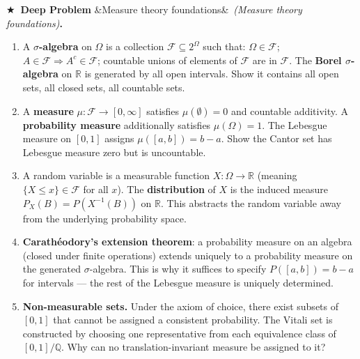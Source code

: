 \documentclass[12pt, a4paper]{article}
\newcounter{problem}
\newcounter{deepproblem}
\newenvironment{deepproblem}[1][]{%
  \refstepcounter{deepproblem}%
  \par\vspace{6pt}%
  \noindent\textbf{\color{NavyBlue}$\bigstar$\ Deep Problem \thedeepproblem}%
  \ifx&#1&\else\ \textit{(#1)}\fi\textbf{.}\enskip
}{\par\vspace{4pt}}
\begin{document}
\begin{deepproblem}[Measure theory foundations]
\begin{enumerate}[label=(\alph*)]
  \item A \textbf{$\sigma$-algebra} on $\Omega$ is a collection $\mathcal{F}\subseteq 2^\Omega$ such that: $\Omega\in\mathcal{F}$; $A\in\mathcal{F}\Rightarrow A^c\in\mathcal{F}$; countable unions of elements of $\mathcal{F}$ are in $\mathcal{F}$. The \textbf{Borel $\sigma$-algebra} on $\mathbb{R}$ is generated by all open intervals. Show it contains all open sets, all closed sets, all countable sets.
  \item A \textbf{measure} $\mu:\mathcal{F}\to[0,\infty]$ satisfies $\mu(\emptyset)=0$ and countable additivity. A \textbf{probability measure} additionally satisfies $\mu(\Omega)=1$. The Lebesgue measure on $[0,1]$ assigns $\mu([a,b])=b-a$. Show the Cantor set has Lebesgue measure zero but is uncountable.
  \item A random variable is a measurable function $X:\Omega\to\mathbb{R}$ (meaning $\{X\leq x\}\in\mathcal{F}$ for all $x$). The \textbf{distribution} of $X$ is the induced measure $P_X(B) = P(X^{-1}(B))$ on $\mathbb{R}$. This abstracts the random variable away from the underlying probability space.
  \item \textbf{Carathéodory's extension theorem}: a probability measure on an algebra (closed under finite operations) extends uniquely to a probability measure on the generated $\sigma$-algebra. This is why it suffices to specify $P([a,b])=b-a$ for intervals --- the rest of the Lebesgue measure is uniquely determined.
  \item \textbf{Non-measurable sets.} Under the axiom of choice, there exist subsets of $[0,1]$ that cannot be assigned a consistent probability. The Vitali set is constructed by choosing one representative from each equivalence class of $[0,1]/\mathbb{Q}$. Why can no translation-invariant measure be assigned to it?
\end{enumerate}
\end{deepproblem}
\end{document}
